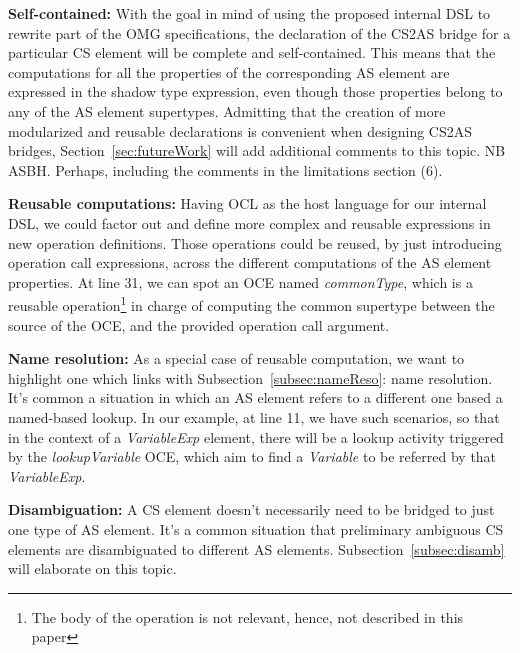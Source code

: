 \documentclass{llncs}
\begin{document}
\textbf{Self-contained:} With the goal in mind of using the proposed internal DSL to rewrite part of the OMG specifications, the declaration of the CS2AS bridge for a particular CS element will be complete and self-contained. This means that the computations for all the properties of the corresponding AS element are expressed in the shadow type expression, even though those properties belong to any of the AS element supertypes. Admitting that the creation of more modularized and reusable declarations is convenient when designing CS2AS bridges, Section~\ref{sec:futureWork} will add additional comments to this topic.
NB ASBH. Perhaps, including the comments in the limitations section (6).

\textbf{Reusable computations:} Having OCL as the  host language for our internal DSL, we could factor out and define more complex and reusable expressions in new operation definitions. Those operations could be reused, by just introducing operation call expressions, across the different computations of the AS element properties. At line 31, we can spot an OCE named \emph{commonType}, which is a reusable operation\footnote{The body of the operation is not relevant, hence, not described in this paper} in charge of computing the common supertype between the source of the OCE, and the provided operation call argument.

\textbf{Name resolution:} As a special case of reusable computation, we want to highlight one which links with Subsection~\ref{subsec:nameReso}: name resolution. It's common a situation in which an AS element refers to a different one based a named-based lookup. In our example, at line 11, we have such scenarios, so that in the context of a \emph{VariableExp} element, there will be a lookup activity triggered by the \emph{lookupVariable} OCE, which aim to find a \emph{Variable} to be referred by that \emph{VariableExp}.

\textbf{Disambiguation:} A CS element doesn't necessarily need to be bridged to just one type of AS element. It's a common situation that preliminary ambiguous CS elements are disambiguated to different AS elements. Subsection~\ref{subsec:disamb} will elaborate on this topic. %
\end{document}
